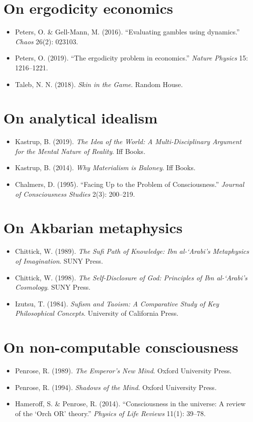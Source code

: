 \documentclass[11pt,a4paper]{book}
\theoremstyle{cleanrm}
\begin{document}
\section*{On ergodicity economics}
\begin{itemize}[leftmargin=2em]
    \item Peters, O. \& Gell-Mann, M. (2016). ``Evaluating gambles
    using dynamics.'' \emph{Chaos} 26(2): 023103.
    \item Peters, O. (2019). ``The ergodicity problem in economics.''
    \emph{Nature Physics} 15: 1216--1221.
    \item Taleb, N. N. (2018). \emph{Skin in the Game}. Random House.
\end{itemize}

\section*{On analytical idealism}
\begin{itemize}[leftmargin=2em]
    \item Kastrup, B. (2019). \emph{The Idea of the World: A
    Multi-Disciplinary Argument for the Mental Nature of Reality}.
    Iff Books.
    \item Kastrup, B. (2014). \emph{Why Materialism is Baloney}.
    Iff Books.
    \item Chalmers, D. (1995). ``Facing Up to the Problem of
    Consciousness.'' \emph{Journal of Consciousness Studies} 2(3):
    200--219.
\end{itemize}

\section*{On Akbarian metaphysics}
\begin{itemize}[leftmargin=2em]
    \item Chittick, W. (1989). \emph{The Sufi Path of Knowledge: Ibn
    al-`Arabi's Metaphysics of Imagination}. SUNY Press.
    \item Chittick, W. (1998). \emph{The Self-Disclosure of God:
    Principles of Ibn al-`Arabi's Cosmology}. SUNY Press.
    \item Izutsu, T. (1984). \emph{Sufism and Taoism: A Comparative
    Study of Key Philosophical Concepts}. University of California
    Press.
\end{itemize}

\section*{On non-computable consciousness}
\begin{itemize}[leftmargin=2em]
    \item Penrose, R. (1989). \emph{The Emperor's New Mind}. Oxford
    University Press.
    \item Penrose, R. (1994). \emph{Shadows of the Mind}. Oxford
    University Press.
    \item Hameroff, S. \& Penrose, R. (2014). ``Consciousness in the
    universe: A review of the `Orch OR' theory.'' \emph{Physics of
    Life Reviews} 11(1): 39--78.
\end{itemize}
\end{document}
